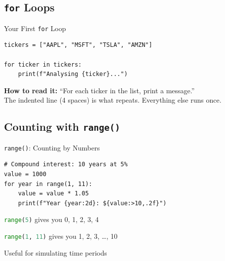 \documentclass[9pt,aspectratio=169]{beamer}
\newcommand{\py}[1]{\lstinline[language=Python]{#1}}
\begin{document}
\subsection{\texttt{for} Loops}
\begin{frame}[fragile]{Your First \texttt{for} Loop}

\begin{lstlisting}
tickers = ["AAPL", "MSFT", "TSLA", "AMZN"]

for ticker in tickers:
    print(f"Analysing {ticker}...")
\end{lstlisting}

\medskip



\medskip

\begin{highlightbox}
\centering
\textbf{How to read it:} ``For each ticker in the list, print a message.''\\
The indented line (4 spaces) is what repeats. Everything else runs once.
\end{highlightbox}

\end{frame}


\subsection{Counting with \texttt{range()}}
\begin{frame}[fragile]{\texttt{range()}: Counting by Numbers}

\begin{lstlisting}
# Compound interest: 10 years at 5%
value = 1000
for year in range(1, 11):
    value = value * 1.05
    print(f"Year {year:2d}: ${value:>10,.2f}")
\end{lstlisting}

\medskip



\medskip

\bi
    \item \py{range(5)} gives you 0, 1, 2, 3, 4
    \item \py{range(1, 11)} gives you 1, 2, 3, \ldots, 10
    \item Useful for simulating time periods
\ei

\end{frame}
\end{document}
